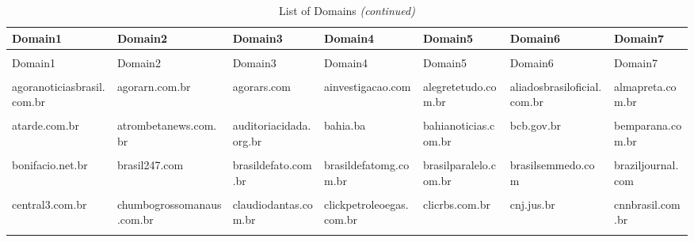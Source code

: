 
\begin{longtable}[t]{lllllll}
\caption{List of Domains}\\
\toprule
Domain1 & Domain2 & Domain3 & Domain4 & Domain5 & Domain6 & Domain7\\
\midrule
\endfirsthead
\caption[]{List of Domains \textit{(continued)}}\\
\toprule
Domain1 & Domain2 & Domain3 & Domain4 & Domain5 & Domain6 & Domain7\\
\midrule
\endhead

\endfoot
\bottomrule
\endlastfoot
\cellcolor{gray!10}{a24.com} & \cellcolor{gray!10}{abcmais.com} & \cellcolor{gray!10}{abril.com.br} & \cellcolor{gray!10}{acaoamazonia.com.br} & \cellcolor{gray!10}{acidigital.com} & \cellcolor{gray!10}{acritica.com} & \cellcolor{gray!10}{agazeta.com.br}\\
agoranoticiasbrasil.com.br & agorarn.com.br & agorars.com & ainvestigacao.com & alegretetudo.com.br & aliadosbrasiloficial.com.br & almapreta.com.br\\
\cellcolor{gray!10}{aloalobahia.com} & \cellcolor{gray!10}{antropofagista.com.br} & \cellcolor{gray!10}{aosfatos.org} & \cellcolor{gray!10}{apublica.org} & \cellcolor{gray!10}{areavip.com.br} & \cellcolor{gray!10}{aredacao.com.br} & \cellcolor{gray!10}{arnewsnoticias.com}\\
atarde.com.br & atrombetanews.com.br & auditoriacidada.org.br & bahia.ba & bahianoticias.com.br & bcb.gov.br & bemparana.com.br\\
\cellcolor{gray!10}{blogbbm.com} & \cellcolor{gray!10}{blogdobarreto.com.br} & \cellcolor{gray!10}{bloomberglinea.com.br} & \cellcolor{gray!10}{bmcnews.com.br} & \cellcolor{gray!10}{bn.gov.br} & \cellcolor{gray!10}{bnews.com.br} & \cellcolor{gray!10}{boatos.org}\\
\addlinespace
bonifacio.net.br & brasil247.com & brasildefato.com.br & brasildefatomg.com.br & brasilparalelo.com.br & brasilsemmedo.com & braziljournal.com\\
\cellcolor{gray!10}{brazilurgente.com.br} & \cellcolor{gray!10}{caixa.gov.br} & \cellcolor{gray!10}{camara.leg.br} & \cellcolor{gray!10}{campograndenews.com.br} & \cellcolor{gray!10}{canalrural.com.br} & \cellcolor{gray!10}{cartacapital.com.br} & \cellcolor{gray!10}{causaoperaria.org.br}\\
central3.com.br & chumbogrossomanaus.com.br & claudiodantas.com.br & clickpetroleoegas.com.br & clicrbs.com.br & cnj.jus.br & cnnbrasil.com.br\\
\cellcolor{gray!10}{coisasdapolitica.com} & \cellcolor{gray!10}{conexao1.com} & \cellcolor{gray!10}{conexaopolitica.com.br} & \cellcolor{gray!10}{congressoemfoco.com.br} & \cellcolor{gray!10}{conjur.com.br} & \cellcolor{gray!10}{consumidor.gov.br} & \cellcolor{gray!10}{contrafatos.com.br}\\

\end{longtable}
